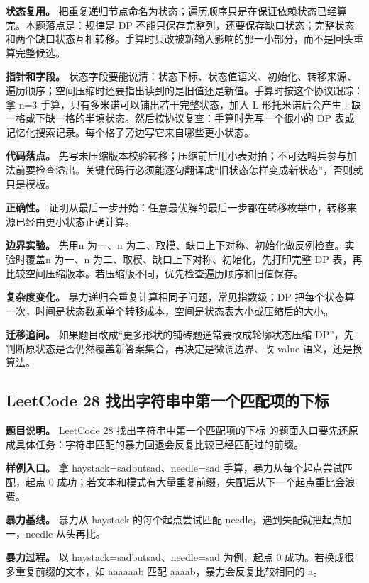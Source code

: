\textbf{状态复用。} 把重复递归节点命名为状态；遍历顺序只是在保证依赖状态已经算完。本题落点是：规律是 DP 不能只保存完整列，还要保存缺口状态；完整状态和两个缺口状态互相转移。手算时只改被新输入影响的那一小部分，而不是回头重算完整候选。

\textbf{指针和字段。} 状态字段要能说清：状态下标、状态值语义、初始化、转移来源、遍历顺序；空间压缩时还要指出读到的是旧值还是新值。手算时按这个协议跟踪：拿 n=3 手算，只有多米诺可以铺出若干完整状态，加入 L 形托米诺后会产生上缺一格或下缺一格的半填状态。然后按协议复查：手算时先写一个很小的 DP 表或记忆化搜索记录。每个格子旁边写它来自哪些更小状态。

\textbf{代码落点。} 先写未压缩版本校验转移；压缩前后用小表对拍；不可达哨兵参与加法前要检查溢出。关键代码行必须能逐句翻译成“旧状态怎样变成新状态”，否则就只是模板。

\textbf{正确性。} 证明从最后一步开始：任意最优解的最后一步都在转移枚举中，转移来源已经由更小状态正确计算。

\textbf{边界实验。} 先用n 为一、n 为二、取模、缺口上下对称、初始化做反例检查。实验时覆盖n 为一、n 为二、取模、缺口上下对称、初始化，先打印完整 DP 表，再比较空间压缩版本。若压缩版不同，优先检查遍历顺序和旧值保存。

\textbf{复杂度变化。} 暴力递归会重复计算相同子问题，常见指数级；DP 把每个状态算一次，时间是状态数乘单个转移成本，空间是状态表大小或压缩后的大小。

\textbf{迁移追问。} 如果题目改成“更多形状的铺砖题通常要改成轮廓状态压缩 DP”，先判断原状态是否仍然覆盖新答案集合，再决定是微调边界、改 value 语义，还是换算法。

\subsection{LeetCode 28 找出字符串中第一个匹配项的下标}

\textbf{题目说明。} LeetCode 28 找出字符串中第一个匹配项的下标 的题面入口要先还原成具体任务：字符串匹配的暴力回退会反复比较已经匹配过的前缀。

\textbf{样例入口。} 拿 haystack=sadbutsad、needle=sad 手算，暴力从每个起点尝试匹配，起点 0 成功；若文本和模式有大量重复前缀，失配后从下一个起点重比会浪费。

\textbf{暴力基线。} 暴力从 haystack 的每个起点尝试匹配 needle，遇到失配就把起点加一，needle 从头再比。

\textbf{暴力过程。} 以 haystack=sadbutsad、needle=sad 为例，起点 0 成功。若换成很多重复前缀的文本，如 aaaaaab 匹配 aaaab，暴力会反复比较相同的 a。

